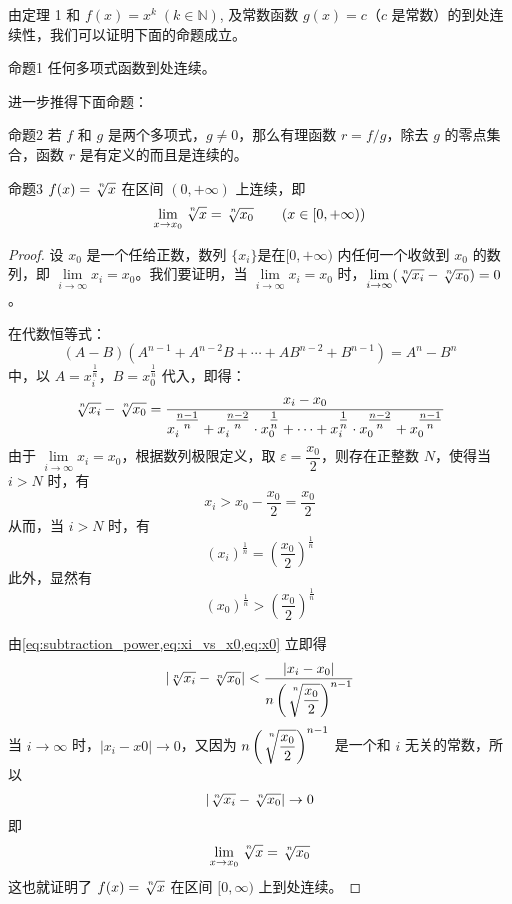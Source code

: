 由定理 1 和 $f(x)=x^k\; (k\in\mathbb{N})$, 及常数函数 $g(x)=c$（$c$ 是常数）的到处连续性，我们可以证明下面的命题成立。

\begin{Theorem}{命题1}
  任何多项式函数到处连续。
\end{Theorem}

进一步推得下面命题：

\begin{Theorem}{命题2}
若 $f$ 和 $g$ 是两个多项式，$g\ne 0$，那么有理函数 $r=f/g$，除去 $g$ 的零点集合，函数 $r$ 是有定义的而且是连续的。
\end{Theorem}

\begin{Theorem}{命题3}
  $f(x)=\sqrt[\uproot{3}\leftroot{-1}n]{x}$ 在区间 $(0,+\infty)$ 上连续，即 
\[\lim_{x\to x_0}\sqrt[\uproot{3}\leftroot{-1}n]{x}=\sqrt[\uproot{3}\leftroot{-1}n]{x_0}\qquad (x\in[0,+\infty))\]
\end{Theorem}

\begin{proof}
  设 $x_0$ 是一个任给正数，数列 $\{x_i\}$是在$[0,+\infty)$
内任何一个收敛到 $x_0$ 的数列，即 $\lim\limits_{i\to \infty} x_i=x_0$。我们要证明，当 $\lim\limits_{i\to\infty} x_i=x_0$ 时，$\lim\limits_{i\to\infty} (\sqrt[\uproot{3}\leftroot{-1}n]{x_i}-\sqrt[\uproot{3}\leftroot{-1}n]{x_0})=0$。

\medskip
在代数恒等式：
\[(A-B)\left(A^{n-1}+A^{n-2}B+\cdots +AB^{n-2}+B^{n-1}\right)=A^n-B^n\]
中，以 $A=x_i^{\tfrac{1}{n}}$，$B=x_0^{\tfrac{1}{n}}$ 代入，即得：
\begin{equation}
  \label{eq:subtraction_power}
\sqrt[\uproot{3}\leftroot{-1}n]{x_i}-\sqrt[\uproot{3}\leftroot{-1}n]{x_0}=\frac{x_i-x_0}{x_i^{\tfrac{n-1}{n}}+x^{\tfrac{n-2}{n}}_i\cdot x_0^{\tfrac{1}{n}}+\cdots +x^{\tfrac{1}{n}}_i\cdot x_0^{\tfrac{n-2}{n}} + x_0^{\tfrac{n-1}{n}}} 
\end{equation}
由于 $\lim\limits_{i\to\infty}x_i=x_0$，根据数列极限定义，取
$\varepsilon=\dfrac{x_0}{2}$，则存在正整数 $N$，使得当 $i>N$ 时，有
\[x_i>x_0-\frac{x_0}{2}=\frac{x_0}{2}\]
从而，当 $i>N$ 时，有
\begin{equation}
  \label{eq:xi_vs_x0}
  (x_i)^{\tfrac{1}{n}}=\left(\frac{x_0}{2}\right)^{\tfrac{1}{n}}
\end{equation}
此外，显然有
\begin{equation}
  \label{eq:x0}
  (x_0)^{\tfrac{1}{n}}>\left(\frac{x_0}{2}\right)^{\tfrac{1}{n}}
\end{equation}

由\cref{eq:subtraction_power,eq:xi_vs_x0,eq:x0} 立即得
\[\left|\sqrt[n]{x_i}-\sqrt[n]{x_0}\right|<\frac{|x_i-x_0|}{n\left(\sqrt[\uproot{12}\leftroot{-3}n]{\dfrac{x_0}{2}}\right)^{n-1}}\]
当 $i\to\infty$ 时，$|x_i-x0|\to 0$，又因为 $n\left(\sqrt[\uproot{12}\leftroot{-3}n]{\dfrac{x_0}{2}}\right)^{n-1}$ 是一个和 $i$ 无关的常数，所以
\[\left|\sqrt[\uproot{3}\leftroot{-1}n]{x_i}-\sqrt[\uproot{3}\leftroot{-1}n]{x_0}\right|\to 0\]
即
\[\lim_{x\to x_0} \sqrt[\uproot{3}\leftroot{-1}n]{x}=\sqrt[\uproot{3}\leftroot{-1}n]{x_0}\]
这也就证明了 $f(x)=\sqrt[\uproot{3}\leftroot{-1}n]{x}$ 在区间 $[0,\infty)$ 上到处连续。
\end{proof}

